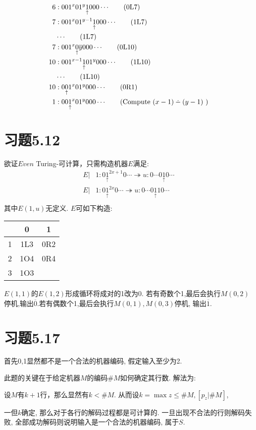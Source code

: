 \documentclass{article}
\newcommand*{\pt}[1]{\ensuremath{\underset{\uparrow}{#1}}}
\def\dotminus{\mathbin{\ooalign{\hss\raise1ex\hbox{.}\hss\cr
  \mathsurround=0pt$-$}}}
\begin{document}
\begin{itemize}
\begin{align*}
		6&:001^x01^{y}\pt1 000\cdots\tag{0L7}\\
		7&:001^x01^{y-1}\pt1 000\cdots\tag{1L7}\\
		&\cdots\tag{1L7}\\
		7&:001^x\pt0\overline { y} 000\cdots\tag{0L10}\\
		10&:001^{x-1}\pt101^{y} 000\cdots\tag{1L10}\\
		&\cdots\tag{1L10}\\
		10&:0\pt01^x01^{y} 000\cdots\tag{0R1}\\
		1&:00\pt1^x01^{y} 000\cdots\tag{Compute $(x-1)\dotminus(y-1)$ }\\
	\end{align*}
\end{itemize}
\section*{习题5.12}
欲证$Even$ Turing-可计算，只需构造机器$E$满足:
\begin{align*}
	E|&1:0\pt1^{2x+1}0\cdots \twoheadrightarrow u : 0\cdots0\pt10\cdots\\
	E|&1:0\pt1^{2x}0\cdots \twoheadrightarrow u : 0\cdots0\pt110\cdots\\
\end{align*}
其中$E(1,u)$无定义. 
$E$可如下构造:
\begin{center}
\begin{tabular}{|c|c|c|}
	\hline
	&0&1\\
	\hline
	1&1L3&0R2\\
	2&1O4&0R4\\
	3&1O3&\\
	\hline
\end{tabular}
\end{center}
$E(1,1)$的$E(1,2)$形成循环将成对的1改为0. 若有奇数个1,最后会执行$M(0,2)$停机,输出$\overline 0$.若有偶数个1,最后会执行$M(0,1),M(0,3)$停机, 输出$\overline 1$. 
\section*{习题5.17}
首先0,1显然都不是一个合法的机器编码, 假定输入至少为2. 

此题的关键在于给定机器$M$的编码$\#M$如何确定其行数.
解法为:

设$M$有$k+1$行，那么显然有$k < \#M$. 
从而设$k = \max z \le \#M, [p_z | \#M]$, 

一但$k$确定, 那么对于各行的解码过程都是可计算的. 一旦出现不合法的行则解码失败, 全部成功解码则说明输入是一个合法的机器编码, 属于$S$. 
\end{document}
